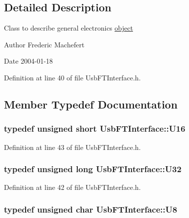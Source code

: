 \subsection{Detailed Description}
Class to describe general electronics \hyperlink{namespaceobject}{object}

\begin{DoxyAuthor}{Author}
Frederic Machefert 
\end{DoxyAuthor}
\begin{DoxyDate}{Date}
2004-\/01-\/18 
\end{DoxyDate}


Definition at line 40 of file UsbFTInterface.h.

\subsection{Member Typedef Documentation}
\hypertarget{classUsbFTInterface_a51f8cba75a1b8eb42ba2c6ba3841f80f}{
\subsubsection[{U16}]{\setlength{\rightskip}{0pt plus 5cm}typedef unsigned short {\bf UsbFTInterface::U16}}}
\label{classUsbFTInterface_a51f8cba75a1b8eb42ba2c6ba3841f80f}


Definition at line 43 of file UsbFTInterface.h.\hypertarget{classUsbFTInterface_aee2201fe4d977aa03568fa8dbacc39ba}{
\subsubsection[{U32}]{\setlength{\rightskip}{0pt plus 5cm}typedef unsigned long {\bf UsbFTInterface::U32}}}
\label{classUsbFTInterface_aee2201fe4d977aa03568fa8dbacc39ba}


Definition at line 42 of file UsbFTInterface.h.\hypertarget{classUsbFTInterface_a3b007566f8af758984d97ada2b9938d3}{
\subsubsection[{U8}]{\setlength{\rightskip}{0pt plus 5cm}typedef unsigned char {\bf UsbFTInterface::U8}}}
\label{classUsbFTInterface_a3b007566f8af758984d97ada2b9938d3}



